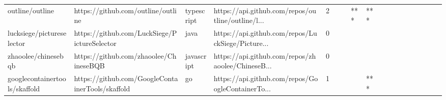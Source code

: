 \begin{tabular}{llllrlllllllllllll}
outline/outline                                    &                 https://github.com/outline/outline &        typescript &  https://api.github.com/repos/outline/outline/l... &       2 &         &        &       *** &            *** &                 &        &           &           &          &          &       &              &          \\
lucksiege/pictureselector                          &       https://github.com/LuckSiege/PictureSelector &              java &  https://api.github.com/repos/LuckSiege/Picture... &       0 &         &        &           &                &                 &        &           &           &          &          &       &              &          \\
zhaoolee/chinesebqb                                &             https://github.com/zhaoolee/ChineseBQB &        javascript &  https://api.github.com/repos/zhaoolee/ChineseB... &       0 &         &        &           &                &                 &        &           &           &          &          &       &              &          \\
googlecontainertools/skaffold                      &   https://github.com/GoogleContainerTools/skaffold &                go &  https://api.github.com/repos/GoogleContainerTo... &       1 &         &        &           &            *** &                 &        &           &           &          &          &       &              &          \\
\bottomrule
\end{tabular}
